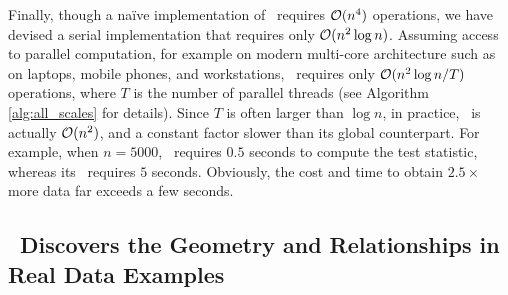 \documentclass[11pt]{extarticle}
\begin{document}
Finally, though a na\"ive implementation of \Mgc~requires $\mathcal{O}(n^4)$ operations, we have devised a serial implementation that requires only $\mathcal{O}(n^2 \log n)$.  Assuming access to parallel computation, for example on modern multi-core architecture such as on laptops, mobile phones, and workstations, \Mgc~requires only $\mathcal{O}(n^2 \log n / T)$ operations, where $T$ is the number of parallel threads (see Algorithm \ref{alg:all_scales} for details).  Since $T$ is often larger than $\log n$, in practice, \Mgc~is actually $\mathcal{O}(n^2)$, and a constant factor slower than its global counterpart.  For example, when $n=5000$, \Mcorr~requires $0.5$ seconds to compute the test statistic, whereas its \Mgc~requires $5$ seconds. Obviously, the cost and time to obtain $2.5 \times$ more data far exceeds a few seconds.



\subsection*{\Mgc~Discovers {the Geometry and} Relationships in Real Data Examples}
\label{numer3}
\end{document}
